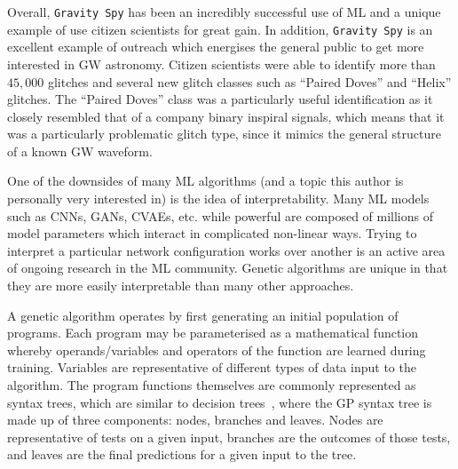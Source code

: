 %
%
Overall, \texttt{Gravity Spy} has been an incredibly successful use of \ac{ML} and a unique example of use citizen scientists for great gain. 
In addition, \texttt{Gravity Spy} is an excellent 
example of outreach which energises the 
general public to get more interested in \ac{GW} astronomy. Citizen 
scientists were able to identify more than $45,000$ glitches and 
several new glitch classes such as ``Paired Doves'' and 
``Helix'' glitches. The ``Paired Doves'' class 
was a particularly useful identification as it closely 
resembled that of a company binary inspiral signals, which means 
that it was a particularly problematic glitch type, since it mimics 
the general structure of a known \ac{GW} waveform. 

%
%
One of the downsides of many \ac{ML} algorithms (and a topic this 
author is personally very interested in) is the idea of interpretability. 
Many \ac{ML} models such as \ac{CNN}s, \ac{GAN}s, \ac{CVAE}s, etc. 
while powerful are composed of millions of model parameters which 
interact in complicated non-linear ways. Trying to interpret  a 
particular network configuration works over another is an active area of 
ongoing research in the \ac{ML} community. Genetic algorithms are unique 
in that they are more easily interpretable than many other approaches.


%
%
A genetic algorithm operates by first generating an initial population of 
programs. Each program may be parameterised as a mathematical function 
whereby operands/variables and operators of the function are learned 
during training. Variables are representative of different types of 
data input to the algorithm. The program functions themselves are commonly 
represented as syntax trees, which are similar to decision
trees~\cite{Kaminski2018}, where the GP syntax tree is made up 
of three components: nodes, branches and leaves. Nodes are representative of 
tests on a given input, branches are the outcomes of those tests, 
and leaves are the final predictions for a given input to the tree.

